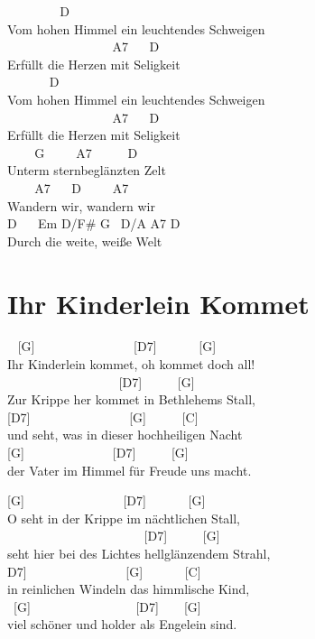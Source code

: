 \documentclass[
  letterpaper,
  twoside=false]{scrbook}
\begin{document}
~ ~ ~ ~ ~ D\\
Vom hohen Himmel ein leuchtendes Schweigen\\
\hspace*{0.333em} ~ ~ ~ ~ ~ ~ ~ ~ ~ ~ A7 ~ ~D\\
Erfüllt die Herzen mit Seligkeit\\
\hspace*{0.333em} ~ ~ ~ ~ D\\
Vom hohen Himmel ein leuchtendes Schweigen\\
\hspace*{0.333em} ~ ~ ~ ~ ~ ~ ~ ~ ~ ~ A7 ~ ~D\\
Erfüllt die Herzen mit Seligkeit\\
\hspace*{0.333em} ~ ~ ~G ~ ~ ~A7 ~ ~ ~ D\\
Unterm sternbeglänzten Zelt\\
\hspace*{0.333em} ~ ~ ~A7 ~ ~D ~ ~ ~A7\\
Wandern wir, wandern wir\\
D ~ ~Em D/F\# G ~D/A A7 D\\
Durch die weite, weiße Welt

\hypertarget{ihr-kinderlein-kommet}{%
\chapter{Ihr Kinderlein Kommet}\label{ihr-kinderlein-kommet}}

~ {[}G{]} ~ ~ ~ ~ ~ ~ ~ ~ ~ {[}D7{]} ~ ~ ~ ~{[}G{]} ~ ~\\
Ihr Kinderlein kommet, oh kommet doch all!\\
\hspace*{0.333em} ~ ~ ~ ~ ~ ~ ~ ~ ~ ~ ~{[}D7{]} ~ ~ ~ {[}G{]} ~ ~\\
Zur Krippe her kommet in Bethlehems Stall,\\
\hspace*{0.333em} {[}D7{]} ~ ~ ~ ~ ~ ~ ~ ~ ~ {[}G{]} ~ ~ ~ {[}C{]}\\
und seht, was in dieser hochheiligen Nacht\\
\hspace*{0.333em} {[}G{]} ~ ~ ~ ~ ~ ~ ~ ~ {[}D7{]} ~ ~ ~ {[}G{]} ~\\
der Vater im Himmel für Freude uns macht.

{[}G{]} ~ ~ ~ ~ ~ ~ ~ ~ ~ {[}D7{]} ~ ~ ~ ~{[}G{]} ~\\
O seht in der Krippe im nächtlichen Stall,\\
\hspace*{0.333em} ~ ~ ~ ~ ~ ~ ~ ~ ~ ~ ~ ~ ~ {[}D7{]} ~ ~ ~ {[}G{]} ~ ~\\
seht hier bei des Lichtes hellglänzendem Strahl,\\
\hspace*{0.333em}{[}D7{]} ~ ~ ~ ~ ~ ~ ~ ~ ~ {[}G{]} ~ ~ ~ ~{[}C{]} ~ ~
~\\
in reinlichen Windeln das himmlische Kind,\\
\hspace*{0.333em} ~{[}G{]} ~ ~ ~ ~ ~ ~ ~ ~ ~ ~{[}D7{]} ~ ~ {[}G{]}\\
viel schöner und holder als Engelein sind.
\end{document}
